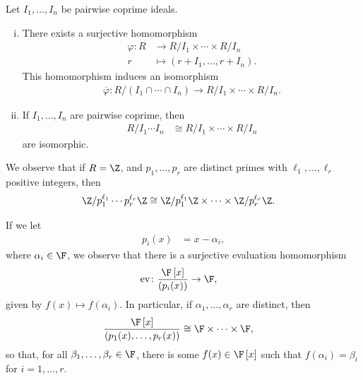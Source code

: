 \documentclass[10pt]{mypackage}
\begin{document}
\begin{theorem}
  Let $I_1,\dots,I_n$ be pairwise coprime ideals.
  \begin{enumerate}[(i)]
    \item There exists a surjective homomorphism 
      \begin{align*}
        \varphi\colon R&\rightarrow  R/I_1\times\cdots\times R/I_n\\
        r &\mapsto \left( r + I_1,\dots, r + I_n \right).
      \end{align*}
      This homomorphism induces an isomorphism
      \begin{align*}
        \overline{\varphi}\colon R/\left( I_1\cap\cdots\cap I_n \right) \rightarrow R/I_1\times\cdots\times R/I_n.
      \end{align*}
    \item If $I_1,\dots,I_n$ are pairwise coprime, then
      \begin{align*}
        R/I_1\cdots I_n &\cong R/I_1\times\cdots\times R/I_n
      \end{align*}
      are isomorphic.
  \end{enumerate}
\end{theorem}
\begin{example}
  We observe that if $R = \Z$, and $p_1,\dots,p_r$ are distinct primes with $\ell_1,\dots,\ell_r$ positive integers, then
  \begin{align*}
    \Z/p_1^{\ell_1}\cdots p_{r}^{\ell_r}\Z &\cong \Z/p_{1}^{\ell_1}\Z \times\cdots\times \Z/p_{r}^{\ell_r}\Z.
  \end{align*}
\end{example}
\begin{example}
  If we let
  \begin{align*}
    p_i(x) &= x-\alpha_i,
  \end{align*}
  where $\alpha_i\in \F$, we observe that there is a surjective evaluation homomorphism
  \begin{align*}
    \operatorname{ev}\colon \frac{\F\left[ x \right]}{\left( p_i(x) \right)} &\rightarrow \F,
  \end{align*}
  given by $f(x) \mapsto f\left( \alpha_i \right)$. In particular, if $\alpha_1,\dots,\alpha_r$ are distinct, then
  \begin{align*}
    \frac{\F\left[ x \right]}{\left( p_1(x),\dots,p_r(x) \right)} &\cong \F\times\cdots\times \F,
  \end{align*}
  so that, for all $\beta_1,\dots,\beta_r\in \F$, there is some $f(x)\in \F\left[ x \right]$ such that $f\left( \alpha_i \right) = \beta_i$ for $ i = 1,\dots,r $.
\end{example}
\end{document}
